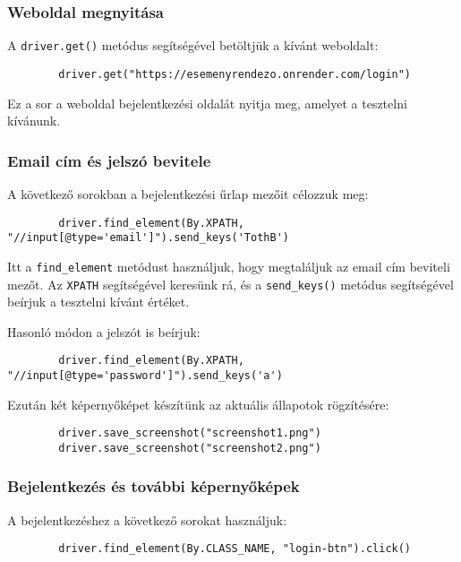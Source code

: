 \documentclass[12pt]{article}
\begin{document}
	\subsubsection{Weboldal megnyitása}
	
	A \texttt{driver.get()} metódus segítségével betöltjük a kívánt weboldalt:
	
	\begin{lstlisting}
		driver.get("https://esemenyrendezo.onrender.com/login")
	\end{lstlisting}
	
	Ez a sor a weboldal bejelentkezési oldalát nyitja meg, amelyet a tesztelni kívánunk.
	
	\subsubsection{Email cím és jelszó bevitele}
	
	A következő sorokban a bejelentkezési űrlap mezőit célozzuk meg:
	
	\begin{lstlisting}
		driver.find_element(By.XPATH, "//input[@type='email']").send_keys('TothB')
	\end{lstlisting}
	
	Itt a \texttt{find\_element} metódust használjuk, hogy megtaláljuk az email cím beviteli mezőt. Az \texttt{XPATH} segítségével keresünk rá, és a \texttt{send\_keys()} metódus segítségével beírjuk a tesztelni kívánt értéket.
	
	Hasonló módon a jelszót is beírjuk:
	
	\begin{lstlisting}
		driver.find_element(By.XPATH, "//input[@type='password']").send_keys('a')
	\end{lstlisting}
	
	Ezután két képernyőképet készítünk az aktuális állapotok rögzítésére:
	
	\begin{lstlisting}
		driver.save_screenshot("screenshot1.png")
		driver.save_screenshot("screenshot2.png")
	\end{lstlisting}
	
	\subsubsection{Bejelentkezés és további képernyőképek}
	
	A bejelentkezéshez a következő sorokat használjuk:
	
	\begin{lstlisting}
		driver.find_element(By.CLASS_NAME, "login-btn").click()
	\end{lstlisting}
	
\end{document}
